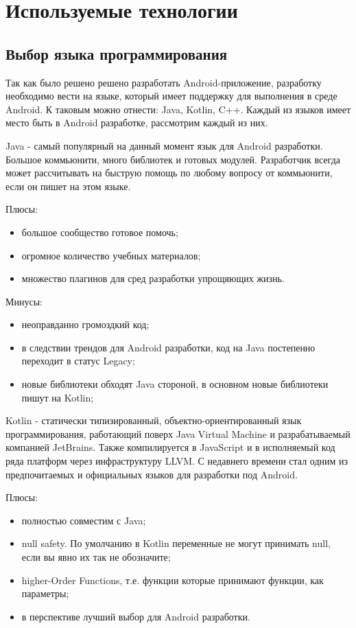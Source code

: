 \section{Используемые технологии}
\label{sec:practice:technology_used}

\subsection{Выбор языка программирования}
Так как было решено решено разработать Android-приложение, разработку необходимо вести на языке, который имеет поддержку для выполнения в среде Android. К таковым можно отнести: Java, Kotlin, C++. Каждый из языков имеет место быть в Android разработке, рассмотрим каждый из них.

Java - самый популярный на данный момент язык для Android разработки. Большое коммьюнити, много библиотек и готовых модулей. Разработчик всегда может рассчитывать на быструю помощь по любому вопросу от коммьюнити, если он пишет на этом языке.

Плюсы:
\begin{itemize}
 \item большое сообщество готовое помочь;
 \item огромное количество учебных материалов;
 \item множество плагинов для сред разработки упрощяющих жизнь.
\end{itemize}

Минусы:
\begin{itemize}
 \item неоправданно громоздкий код;
 \item в следствии трендов для Android разработки, код на Java постепенно переходит в статус Legacy;
 \item новые библиотеки обходят Java стороной, в основном новые библиотеки пишут на Kotlin;
\end{itemize}
 
Kotlin - статически типизированный, объектно-ориентированный язык программирования, работающий поверх Java Virtual Machine и разрабатываемый компанией JetBrains. Также компилируется в JavaScript и в исполняемый код ряда платформ через инфраструктуру LLVM. С недавнего времени стал одним из предпочитаемых и официальных языков для разработки под Android.

Плюсы:
\begin{itemize}
 \item полностью совместим с Java;
 \item null safety. По умолчанию в Kotlin переменные не могут принимать null, если вы явно их так не обозначите;
 \item higher-Order Functions, т.е. функции которые принимают функции, как параметры;
 \item в перспективе лучший выбор для Android разработки.
\end{itemize}

